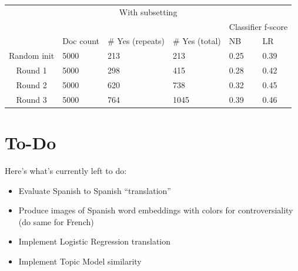 \documentclass[11pt]{article} %
\begin{document}
\begin{tabular}{|c|l|l|l|l|l|}
\multicolumn{6}{|c|}{With subsetting} \\
\rowcolor{gray!50} &&&& \multicolumn{2}{|c|}{Classifier f-score} \\
\rowcolor{gray!50} & Doc count & \# Yes (repeats) & \# Yes (total) & NB & LR \\
Random init & 5000 & 213 & 213 & 0.25 & 0.39 \\
Round 1 & 5000 & 298 & 415 & 0.28 & 0.42 \\
Round 2 & 5000 & 620 & 738 & 0.32 & 0.45 \\
Round 3 & 5000 & 764 & 1045 & 0.39 & 0.46 \\
\end{tabular}

\section{To-Do}
Here's what's currently left to do:
\begin{itemize}
\item Evaluate Spanish to Spanish ``translation''
\item Produce images of Spanish word embeddings with colors for controversiality (do same for French)
\item Implement Logistic Regression translation
\item Implement Topic Model similarity
\end{itemize}
\end{document}

